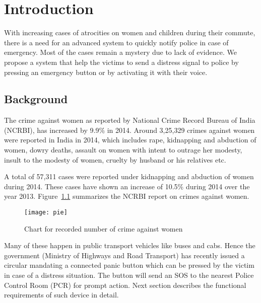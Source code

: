 
\chapter{Introduction}

With increasing cases of atrocities on women and children during their commute, there is a need for an advanced system to quickly notify police in case of emergency. Most of the cases remain a mystery due to lack of evidence. We propose a system that help the victims to send a distress signal to police by pressing an emergency button or by activating it with their voice.
 


\section{Background}

The crime against women as reported by National Crime Record Bureau of India (NCRBI), has increased by 9.9\% in 2014. Around 3,25,329 crimes against women were reported in India in 2014, which includes rape, kidnapping and abduction of women, dowry deaths, assault on women with intent to outrage her modesty, insult to the modesty of women, cruelty by husband or his relatives etc.

A total of 57,311 cases were reported under kidnapping and abduction of women during 2014. These cases have shown an increase of 10.5\% during 2014 over the year 2013. Figure~\ref{fig:pie} summarizes the NCRBI report\cite{ncrbi} on crimes against women.

\begin{figure}[H]
\centering
\texttt{[image: pie]}
\caption{Chart for recorded number of crime against women}
\label{fig:pie}
\end{figure}

Many of these happen in public transport vehicles like buses and cabs. Hence the government (Ministry of Highways and Road Transport) has recently issued a circular mandating a connected panic button which can be pressed by the victim in case of a distress situation. The button will send an SOS to the nearest Police Control Room (PCR) for prompt action. Next  section describes the functional requirements of such device in detail.



